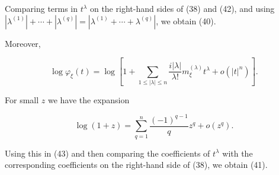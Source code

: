 Comparing terms in $t^{\lambda}$ on the right-hand sides of (38) and (42), and using $|\lambda^{(1)}| + \cdots + |\lambda^{(q)}| = |\lambda^{(1)} + \cdots + \lambda^{(q)}|$, we obtain (40).

Moreover,

$$\log \varphi_{\xi}(t) = \log \left[ 1 + \sum_{1 \leq |\lambda| \leq n} \frac{i|\lambda|}{\lambda!} m_{\xi}^{(\lambda)} t^{\lambda} + o(|t|^n) \right].$$

For small $z$ we have the expansion

$$\log(1 + z) = \sum_{q=1}^{n} \frac{(-1)^{q-1}}{q} z^q + o(z^q).$$

Using this in (43) and then comparing the coefficients of $t^{\lambda}$ with the corresponding coefficients on the right-hand side of (38), we obtain (41).
